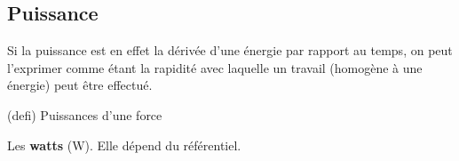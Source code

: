 \documentclass[../../main/main.tex]{subfiles}
\begin{document}
\subsection{Puissance}
Si la puissance est en effet la dérivée d'une énergie par rapport au temps, on
peut l'exprimer comme étant la rapidité avec laquelle un travail (homogène à une
énergie) peut être effectué.
\begin{tcb*}[sidebyside, label=defi:pforce, righthand ratio=.25, sidebyside
		align=top](defi) {Puissances d'une force}
	\begin{isd}[sidebyside align=top]
		\psw{
			\[\Pc_m = \frac{W_{\ABr}(\Ff)}{\Dt}\]
		}
		\tcblower
		\vspace{-15pt}
		\vspace{-15pt}
	\end{isd}
	\tcblower
	Les \textbf{watts} (W).
	\smallbreak
	Elle dépend du référentiel.
\end{tcb*}
\end{document}
